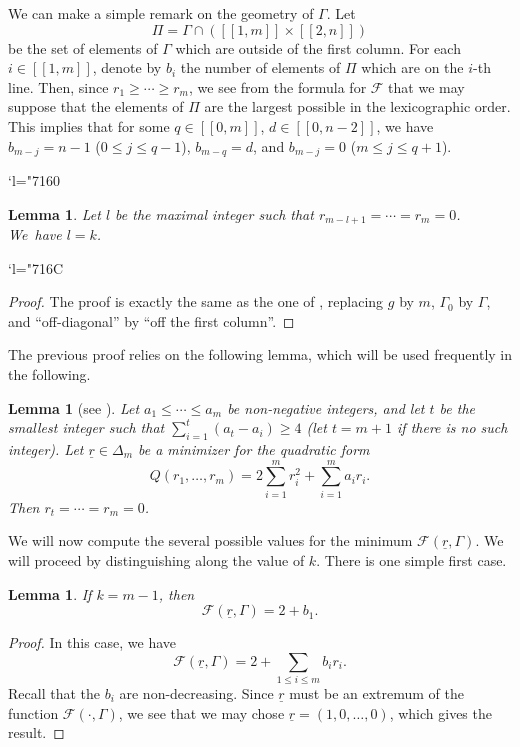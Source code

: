 \documentclass[JEP,XML,SOM,Unicode, NoEqCountersInSection,NoFloatCountersInSection,published]{cedram}
\let\mathcal\mathscr
\newcommand{\Changel}{\mathcode`l="7160}
\newcommand{\Changelback}{\mathcode`l="716C}
\newcommand{\llbracket}{[\![}
\newcommand{\rrbracket}{]\!]}
\theoremstyle{theorem}
\newtheorem{lemma}[proposition]{Lemma}
\theoremstyle{definition}
\begin{document}
We can make a simple remark on the geometry of $\Gamma$. Let
\[
\Pi = \Gamma \cap \left( \llbracket 1, m \rrbracket \times \llbracket 2, n \rrbracket \right)
\]
be the set of elements of $\Gamma$ which are outside of the first column. For each $i \in \llbracket 1, m \rrbracket$, denote by $b_i$ the number of elements of $\Pi$ which are on the $i$-th line. Then, since $r_1 \geq \cdots \geq r_m$, we see from the formula for $\mathcal F$ that we may suppose that the elements of $\Pi$ are the largest possible in the lexicographic order. This implies that for some $q \in \llbracket 0, m \rrbracket$, $d \in \llbracket 0, n - 2 \rrbracket$, we have $b_{m-j} = n - 1$ ($0 \leq j \leq q - 1$), $b_{m-q} = d$, and $b_{m-j} = 0$ ($m \leq j \leq q + 1$).

\Changel
\begin{lemma} \label{lemlk} Let $l$ be the maximal integer such that $r_{m - l + 1} =\cdots= r_m = 0$. We~have $l = k$.
\end{lemma}
\Changelback

\begin{proof}
The proof is exactly the same as the one of \cite[Lem.\,3.8]{cad18}, replacing $g$ by $m$, $\Gamma_0$ by $\Gamma$, and ``off-diagonal'' by ``off the first column''.
\end{proof}

The previous proof relies on the following lemma, which will be used frequently in the following.

\begin{lemma} [{see \cite[Lem.\,3.9]{cad18}}] \label{lemquadform} Let $a_1 \leq \cdots \leq a_m$ be non-negative integers, and let $t$ be the smallest integer such that $\sum_{i=1}^t (a_t - a_i) \geq 4$ (let $t = m + 1$ if there is no such integer). Let $\underline{r} \in \Delta_m$ be a minimizer for the quadratic form
\[
Q(r_1,\dots, r_m) = 2 \sum_{i = 1}^m r_i^2 + \sum_{i = 1}^m a_i r_i.
\]
Then $r_{t} =\cdots= r_m = 0$.
\end{lemma}

We will now compute the several possible values for the minimum $\mathcal F(\underline{r}, \Gamma)$. We will proceed by distinguishing along the value of $k$. There is one simple first case.

\begin{lemma} If $k = m - 1$, then
\[
\mathcal F(\underline{r}, \Gamma) = 2 + b_1.
\]
\end{lemma}
\begin{proof}
In this case, we have
\[
\mathcal F(\underline{r}, \Gamma) = 2 + \sum_{1 \leq i \leq m} b_i r_i.
\]
Recall that the $b_i$ are non-decreasing. Since $\underline{r}$ must be an extremum of the function $\mathcal F(\cdot, \Gamma)$, we see that we may chose $\underline{r} = (1, 0,\dots, 0)$, which gives the result.
\end{proof}
\end{document}
